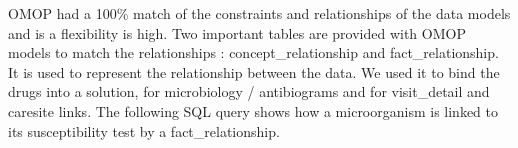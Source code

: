 \begin{table*}[t]
\label{table:mapping}
\end{table*}

OMOP had a 100\% match of the constraints and relationships of the data models
and is a flexibility is high. 
Two important tables are provided with OMOP models to match the relationships : 
concept\_relationship and fact\_relationship. It is used to represent the 
relationship between the data. We used it to bind the drugs into a solution, 
for microbiology / antibiograms and for visit\_detail and caresite links. 
The following SQL query shows how a microorganism is linked to its susceptibility 
test by a fact\_relationship.

